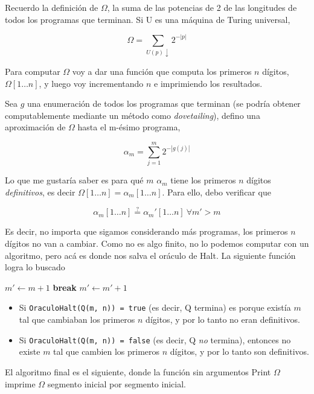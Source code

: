 \documentclass{article}
\theoremstyle{definition} %
\newcommand{\progends}{\downarrow}
\newcommand{\firstn}[1]{\first{n}{#1}}
\newcommand{\first}[2]{#2[1 \dots #1]}
\begin{document}
Recuerdo la definición de $\Omega$, la suma de las potencias de 2 de las
longitudes de todos los programas que terminan. Si U es una máquina de Turing
universal,

\[
    \Omega = \sum_{U(p)\progends} 2 ^ {-|p|}
\]

Para computar $\Omega$ voy a dar una función que computa los primeros $n$
dígitos, $\firstn{\Omega}$, y luego voy incrementando $n$ e imprimiendo los
resultados.

Sea $g$ una enumeración de todos los programas que terminan (se
podría obtener computablemente mediante un método como \textit{dovetailing}),
defino una aproximación de $\Omega$ hasta el m-ésimo programa,

\[
    \alpha_m = \sum_{j = 1}^{m} 2 ^ {-|g(j)|}
\]

Lo que me gustaría saber es para qué $m$ $\alpha_m$ tiene los primeros $n$
dígitos \textit{definitivos}, es decir $\firstn{\Omega} = \firstn{\alpha_m}$.
Para ello, debo verificar que

\[
    \firstn{\alpha_m} \overset{?}{=} \firstn{\alpha_m'}\ \forall m' > m
\]

Es decir, no importa que sigamos considerando más programas, los primeros $n$
dígitos no van a cambiar. Como no es algo finito, no lo podemos computar con un
algoritmo, pero acá es donde nos salva el oráculo de Halt. La siguiente función
logra lo buscado

\begin{algorithmic}
        \State $m' \gets m + 1$
            \If{$\firstn{\alpha_m} \neq \firstn{\alpha_m'}$}
            \State \textbf{break}
            \EndIf
            \State $m' \gets m' + 1$
        \EndWhile
    \EndFunction
\end{algorithmic}

\begin{itemize}
    \item Si \texttt{OraculoHalt(Q(m, n)) = true} (es decir, Q termina) es
    porque existía $m$ tal que cambiaban los primeros $n$ dígitos, y por lo
    tanto no eran definitivos.

    \item Si \texttt{OraculoHalt(Q(m, n)) = false} (es decir, Q \textit{no}
    termina), entonces no existe $m$ tal que cambien los primeros $n$ dígitos, y
    por lo tanto son definitivos.
\end{itemize}

El algoritmo final es el siguiente, donde la función sin argumentos Print
$\Omega$ imprime $\Omega$ segmento inicial por segmento inicial.
\end{document}
